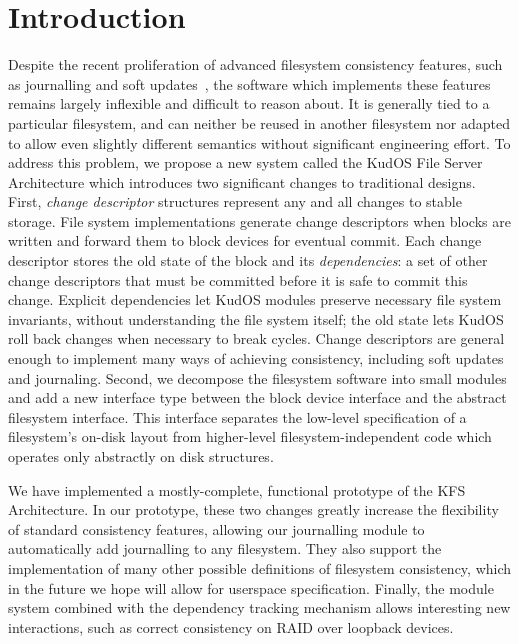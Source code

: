 \section*{Introduction}
\label{sec:intro}

Despite the recent proliferation of advanced filesystem consistency
features, such as journalling and soft updates~\cite{ganger00soft},
the software which implements these features remains largely
inflexible and difficult to reason about. It is generally tied to a
particular filesystem, and can neither be reused in another filesystem
nor adapted to allow even slightly different semantics without
significant engineering effort. To address this problem, we propose a
new system called the KudOS File Server Architecture which introduces
two significant changes to traditional designs. 
%
First, \emph{change descriptor} structures represent any and all changes to
stable storage.
%
File system implementations generate change descriptors when blocks are
written and forward them to block devices for eventual commit.
%
Each change descriptor stores the old state of the block and its
\emph{dependencies}: a set of other change descriptors that must be
committed before it is safe to commit this change.
%
Explicit dependencies let KudOS modules preserve necessary file system
invariants, without understanding the file system itself; the old state
lets KudOS roll back changes when necessary to break cycles.
%
Change descriptors are general enough to implement many ways of achieving
consistency, including soft updates and journaling.
%
%
%
Second,
we decompose the filesystem software into small modules and add a new
interface type between the block device interface and the abstract
filesystem interface.  This interface separates the low-level
specification of a filesystem's on-disk layout from higher-level
filesystem-independent code which operates only abstractly on disk
structures.

We have implemented a mostly-complete, functional prototype of the KFS
Architecture. In our prototype, these two changes greatly increase the
flexibility of standard consistency features, allowing our journalling
module to automatically add journalling to any filesystem. They also support
the implementation of many other possible definitions of filesystem
consistency, which in the future we hope will allow for userspace
specification. Finally, the module system combined with the dependency
tracking mechanism allows interesting new interactions, such as correct
consistency on RAID over loopback devices.

